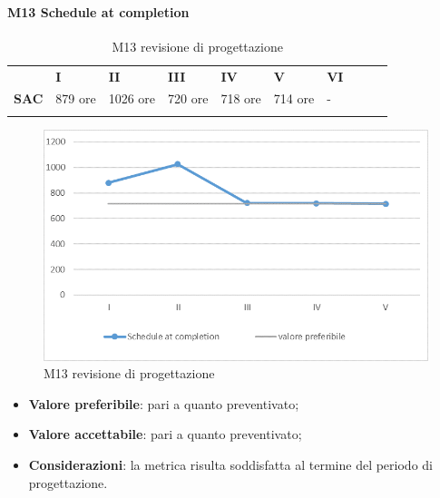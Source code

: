 \paragraph{M13 Schedule at completion} \mbox{}
\begin{longtable}[H!] {						
	>{}p{18mm}  		
	>{}p{16mm}
	>{}p{16mm}		
	>{}p{16mm}		
	>{}p{16mm}		
	>{}p{16mm}		
	>{}p{16mm}
	>{}p{16mm}
	>{}p{16mm}
	>{}p{16mm}
	}
	\rowcolor{gray!50}
	\textbf{} & \textbf{I} & \textbf{II} & \textbf{III} & \textbf{IV} & \textbf{V} & \textbf{VI} \TBstrut \\ [2mm]
	\textbf{SAC} & 879 ore & 1026 ore & 720 ore & 718 ore & 714 ore & - \TBstrut \\ [2mm]
	\rowcolor{white}
	\caption{M13 revisione di progettazione}
\end{longtable}
\begin{figure}[H] 	
\includegraphics[width=\linewidth]{./img/grafici/RP10.png}	
\caption{M13 revisione di progettazione}	
\end{figure}
\begin{itemize}
	\item \textbf{Valore preferibile}: pari a quanto preventivato;
	\item \textbf{Valore accettabile}: pari a quanto preventivato;
	\item \textbf{Considerazioni}: la metrica risulta soddisfatta al termine del periodo di progettazione.
\end{itemize}
